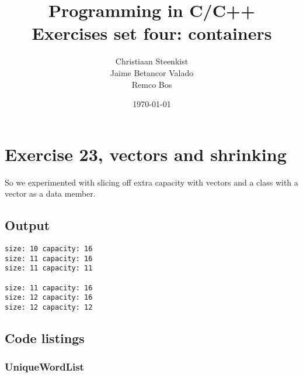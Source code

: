 \documentclass[11pt]{article}
\begin{document}
\title{Programming in C/C++ \\
       Exercises set four: containers
}
\date{\today}
\author{Christiaan Steenkist \\
Jaime Betancor Valado \\
Remco Bos \\
}

\maketitle
\section*{Exercise 23, vectors and shrinking}
So we experimented with slicing off extra capacity with vectors and a class with a vector as a data member.

\subsection*{Output}
\begin{lstlisting}
size: 10 capacity: 16
size: 11 capacity: 16
size: 11 capacity: 11

size: 11 capacity: 16
size: 12 capacity: 16
size: 12 capacity: 12
\end{lstlisting}

\subsection*{Code listings}







\subsubsection*{UniqueWordList}









\end{document}
